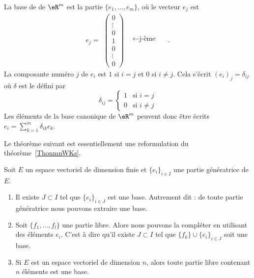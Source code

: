 \begin{example}
    La base de  de \( \eR^m\) est la partie $\{e_1,\ldots, e_m\}$, où le vecteur $e_j$ est
    \begin{equation}\nonumber
      e_j=
    \begin{array}{cc}
      \begin{pmatrix}
        0\\\vdots\\0\\1\\ 0\\\vdots\\0
      \end{pmatrix} &
      \begin{matrix}
        \quad\\\quad\\\leftarrow\textrm{j-ème} \quad\\\quad\\\quad\\
      \end{matrix}
    \end{array}.
    \end{equation}
    La composante numéro $j$ de $e_i$ est $1$ si $i=j$ et $0$ si $i\neq j$. Cela s'écrit $(e_i)_j=\delta_{ij}$ où $\delta$ est le  défini par
    \begin{equation}
        \delta_{ij}=\begin{cases}
            1	&	\text{si }i=j\\
            0	&	 \text{si }i\neq j
        \end{cases}
    \end{equation}
    Les éléments de la base canonique de $\eR^m$ peuvent donc être écrits $e_i=\sum_{k=1}^m\delta_{ik}e_k$.
\end{example}

Le théorème suivant est essentiellement une reformulation du théorème~\ref{ThonmnWKs}.
\begin{theorem} \label{ThoBaseIncompjblieG}     \label{ThoMGQZooIgrXjy}
    Soit \( E\) un espace vectoriel de dimension finie et \( \{ e_i \}_{i\in I}\) une partie génératrice de \( E\).

    \begin{enumerate}
        \item
            Il existe \( J\subset I\) tel que \( \{ e_i \}_{i\in J}\) est une base. Autrement dit : de toute partie génératrice nous pouvons extraire une base.
        \item
            Soit \( \{ f_1,\ldots, f_l \}\) une partie libre. Alors nous pouvons la compléter en utilisant des éléments \( e_i\). C'est à dire qu'il existe \( J\subset I\) tel que \( \{ f_k \}\cup\{ e_i \}_{i\in J}\) soit une base.
        \item       \label{ItemHIVAooPnTlsBi}
            Si \( E\) est un espace vectoriel de dimension \( n\), alors toute partie libre contenant \( n\) éléments est une base.
    \end{enumerate}
\end{theorem}

